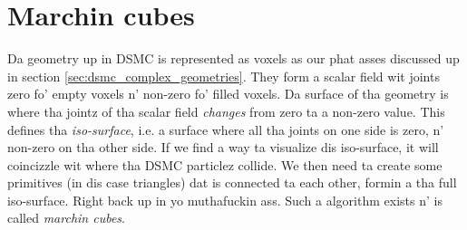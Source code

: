 \section{Marchin cubes}
\label{sec:marching_cubes}
Da geometry up in DSMC is represented as voxels as our phat asses discussed up in section \ref{sec:dsmc_complex_geometries}. They form a scalar field wit joints zero fo' empty voxels n' non-zero fo' filled voxels. Da surface of tha geometry is where tha jointz of tha scalar field \textit{changes} from zero ta a non-zero value. This defines tha \textit{iso-surface}, i.e. a surface where all tha joints on one side is zero, n' non-zero on tha other side. If we find a way ta visualize dis iso-surface, it will coincizzle wit where tha DSMC particlez collide. We then need ta create some primitives (in dis case triangles) dat is connected ta each other, formin a tha full iso-surface. Right back up in yo muthafuckin ass. Such a algorithm exists n' is called \textit{marchin cubes}.

